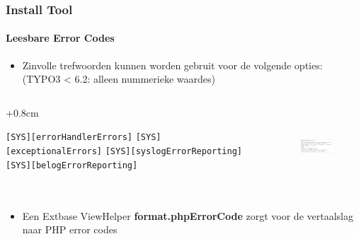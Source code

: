 \begin{frame}[fragile]
	\frametitle{Install Tool}
	\framesubtitle{Leesbare Error Codes}

	\begin{itemize}
		\item Zinvolle trefwoorden kunnen worden gebruit voor de volgende opties:\newline
			(TYPO3 < 6.2: alleen nummerieke waardes)
	\end{itemize}

	\begin{columns}[T]
		\begin{column}{.5\textwidth}
			\advance\leftskip+0.8cm

			\smaller
				\texttt{[SYS][errorHandlerErrors]}\newline
				\texttt{[SYS][exceptionalErrors]}\newline
				\texttt{[SYS][syslogErrorReporting]}\newline
				\texttt{[SYS][belogErrorReporting]}\newline
			\normalsize

		\end{column}
		\begin{column}{.5\textwidth}

			\begin{figure}\vspace*{-0.4cm}
				\includegraphics[width=5cm,height=3cm]{Images/InstallTool/HumanFriendlyErrorCodes.png}
			\end{figure}

		\end{column}
	\end{columns}

	\begin{itemize}
		\item Een Extbase ViewHelper \textbf{format.phpErrorCode} zorgt voor de vertaalslag naar PHP error codes
	\end{itemize}


\end{frame}


